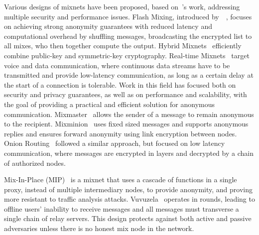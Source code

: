 Various designs of mixnets have been proposed, based on~\citeauthor{Chaum2003}'s work, addressing multiple security and performance issues. Flash Mixing, introduced by~\citeauthor{FlashMixing}~\cite{FlashMixing}, focuses on achieving strong anonymity guarantees with reduced latency and computational overhead by shuffling messages, broadcasting the encrypted list to all mixes, who then together compute the output. Hybrid Mixnets~\cite*{HybridMixJakobsson, HybridMixMiyako} efficiently combine public-key and symmetric-key cryptography. Real-time Mixnets~\cite{RealTimeMix} target voice and data communication, where continuous data streams have to be transmitted and provide low-latency communication, as long as a certain delay at the start of a connection is tolerable.
Work in this field has focused both on security and privacy guarantees, as well as on performance and scalability, with the goal of providing a practical and efficient solution for anonymous communication. Mixmaster~\cite{Mixmaster} allows the sender of a message to remain anonymous to the recipient. Mixminion~\cite{Mixminion} uses fixed sized messages and supports anonymous replies and ensures forward anonymity using link encryption between nodes.
Onion Routing~\cite{OnionRouting} followed a similar approach, but focused on low latency communication, where messages are encrypted in layers and decrypted by a chain of authorized nodes. 

Mix-In-Place (MIP)~\cite{MixInPlace} is a mixnet that uses a cascade of functions in a single proxy, instead of multiple intermediary nodes, to provide anonymity, and proving more resistant to traffic analysis attacks. 
Vuvuzela~\cite{Vuvuzela} operates in rounds, leading to offline users' inability to receive messages and all messages must transverse a single chain of relay servers. This design protects against both active and passive adversaries unless there is no honest mix node in the network.

